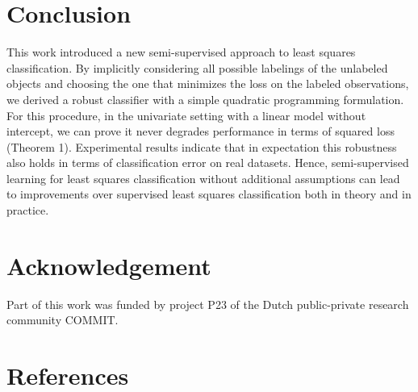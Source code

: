 \documentclass{elsarticle}
\begin{document}
\section{Conclusion}
This work introduced a new semi-supervised approach to least squares classification. By implicitly considering all possible labelings of the unlabeled objects and choosing the one that minimizes the loss on the labeled observations, we derived a robust classifier with a simple quadratic programming formulation. For this procedure, in the univariate setting with a linear model without intercept, we can prove it never degrades performance in terms of squared loss (Theorem 1). Experimental results indicate that in expectation this robustness also holds in terms of classification error on real datasets. Hence, semi-supervised learning for least squares classification without additional assumptions can lead to improvements over supervised least squares classification both in theory and in practice.

\section*{Acknowledgement}
Part of this work was funded by project P23 of the Dutch public-private research community COMMIT.

\section*{References}


\end{document}
